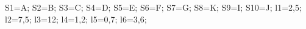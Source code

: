 \documentclass[exercice]{thedocument}%
\begin{document}
%
    \>S1=A;%
    \>S2=B;%
    \>S3=C;%
    \>S4=D;%
    \>S5=E;%
    \>S6=F;%
    \>S7=G;%
    \>S8=K;%
    \>S9=I;%
    \>S10=J;%
    \>l1=2,5;%
    \>l2=7,5;%
    \>l3=12;%
    \>l4=1,2;%
    \>l5=0,7;%
    \>l6=3,6;%
\end{document}
